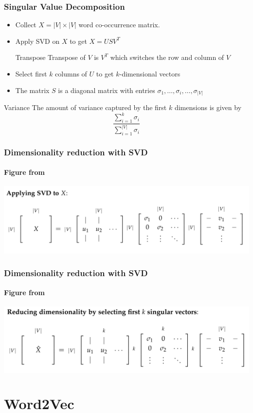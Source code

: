 \begin{frame}
\frametitle{Singular Value Decomposition}
\begin{itemize}[<+->]
\item Collect $X = |V| \times |V|$ word co-occurrence matrix.
\item Apply SVD on $X$ to get $X = U S V^T$
\pause
\begin{block}{Transpose}
Transpose of $V$ is $V^T$ which switches the row and column of $V$
\end{block}
\item Select first $k$ columns of $U$ to get $k$-dimensional vectors
\item The matrix $S$ is a diagonal matrix with entries $\sigma_1, \ldots, \sigma_i, \ldots, \sigma_{|V|}$
\end{itemize}
\pause 
\begin{alertblock}{Variance}
The amount of variance captured by the first $k$ dimensions is given by
\[ \frac{\sum_{i=1}^k \sigma_i}{\sum_{i=1}^{|V|} \sigma_i} \]\end{alertblock}
\end{frame}

\begin{frame}
\frametitle{Dimensionality reduction with SVD}
\framesubtitle{Figure from \cite{cs224n}}
\includegraphics[scale=.38]{figures/wordvectors/svdapply}	
\end{frame}

\begin{frame}
\frametitle{Dimensionality reduction with SVD}
\framesubtitle{Figure from \cite{cs224n}}
\includegraphics[scale=.38]{figures/wordvectors/reducedim}	
\end{frame}

\section{Word2Vec}
\frame{\tableofcontents[currentsection]}

